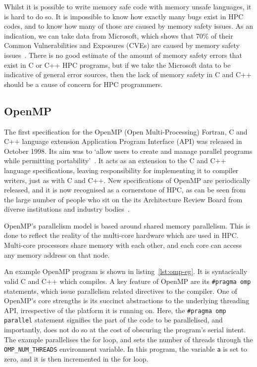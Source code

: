 Whilst it is possible to write memory safe code with memory unsafe languages, it is hard to do so. It is impossible to know how exactly many bugs exist in HPC codes, and to know how many of those are caused by memory safety issues.
As an indication, we can take data from Microsoft, which shows that 70\% of their Common Vulnerabilities and Exposures (CVEs) are caused by memory safety issues~\cite{MicroBugs}. There is no good estimate of the amount of memory safety errors that exist in C or C++ HPC programs, but if we take the Microsoft data to be indicative of general error sources, then the lack of memory safety in C and C++ should be a cause of concern for HPC programmers.

\subsection{OpenMP}
The first specification for the OpenMP (Open Multi-Processing) Fortran, C and C++ language extension Application Program Interface (API) was released in October 1998. Its aim was to `allow users to create and manage parallel programs while permitting portability'~\cite{OpenMPSpec}. It acts as an extension to the C and C++ language specifications, leaving responsibility for implementing it to compiler writers, just as with C and C++. New specifications of OpenMP are periodically released, and it is now recognised as a cornerstone of HPC, as can be seen from the large number of people who sit on the its Architecture Review Board from diverse institutions and industry bodies~\cite{OpenMPARB}.

OpenMP's parallelism model is based around shared memory parallelism. This is done to reflect the reality of the multi-core hardware which are used in HPC\@. Multi-core processors share memory with each other, and each core can access any memory address on that node.  

An example OpenMP program is shown in listing~\ref{lst:omp-eg}. It is syntacically valid C and C++ which compiles. A key feature of OpenMP are its \texttt{\#pragma omp} statements, which issue parallelism related directives to the compiler. 
One of OpenMP's core strengths is its succinct abstractions to the underlying threading API, irrespective of the platform it is running on.
Here, the \texttt{\#pragma omp parallel} statement signifies the part of the code to be parallelised, and importantly, does not do so at the cost of obscuring the program's serial intent.
The example parallelises the for loop, and sets the number of threads through the \texttt{OMP\_NUM\_THREADS} environment variable. In this program, the variable \texttt{a} is set to zero, and it is then incremented in the for loop.

